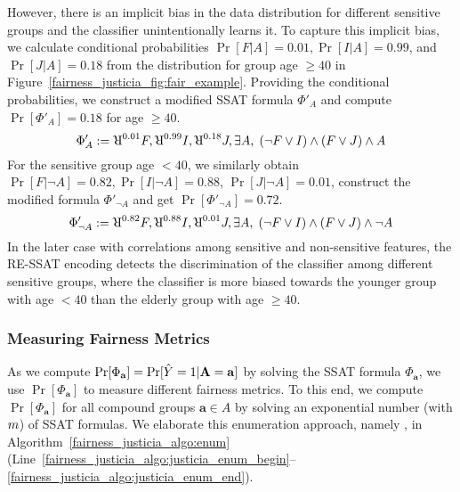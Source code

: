 \begin{example}
	However, there is an implicit bias in the data distribution for different sensitive groups and the classifier unintentionally learns it. To capture this implicit bias, we calculate conditional probabilities  $ \Pr[F|A] = 0.01, \Pr[I|A] = 0.99 $, and $ \Pr[J|A] = 0.18 $ from the distribution for group age $ \ge 40 $ in Figure~\ref{fairness_justicia_fig:fair_example}. Providing the conditional probabilities, we construct a modified SSAT formula $\Phi'_A $ and compute $ \Pr[\Phi'_A] = 0.18 $ for age $ \ge 40 $. 
	\begin{equation}
	\Phi'_A := \R^{0.01}F, \R^{0.99}I, \R^{0.18}J, \exists A, \; (\neg F \vee I) \wedge (F \vee J) \wedge A\notag
	\end{equation}
	For the sensitive group age $ < 40 $,  we similarly obtain $ \Pr[F|\neg A] = 0.82, \Pr[I|\neg A] = 0.88 $, $ \Pr[J|\neg A] = 0.01 $, construct the modified formula $ \Phi'_{\neg A} $ and get  $ \Pr[\Phi'_{\neg A}] = 0.72 $. 
	\[ \Phi'_{\neg A} := \R^{0.82}F, \R^{0.88}I, \R^{0.01}J, \exists A, \; (\neg F \vee I) \wedge (F \vee J) \wedge \neg A \]	
	In the later case with correlations among sensitive and non-sensitive features, the RE-SSAT encoding detects the discrimination of the classifier among different sensitive groups, where the classifier is more biased towards the younger group with age $ < 40 $ than the elderly group with age $ \ge 40 $.
	
	

	
	
\end{example}

\subsubsection{Measuring Fairness Metrics}
As we compute $ \Pr[\Phi_\mathbf{a}] = \Pr[\hat{Y} = 1 | \mathbf{A} = \mathbf{a}] $ by solving the SSAT formula $ \Phi_\mathbf{a} $, we  use $ \Pr[\Phi_\mathbf{a}] $ to measure different fairness metrics. To this end, we compute $ \Pr[\Phi_\mathbf{a}] $ for all compound groups $\mathbf{a} \in A$ by solving an exponential number (with $ m $) of SSAT formulas. We elaborate this enumeration approach, namely {\justiciaenum}, in Algorithm~\ref{fairness_justicia_algo:enum}  (Line~\ref{fairness_justicia_algo:justicia_enum_begin}--\ref{fairness_justicia_algo:justicia_enum_end}).

